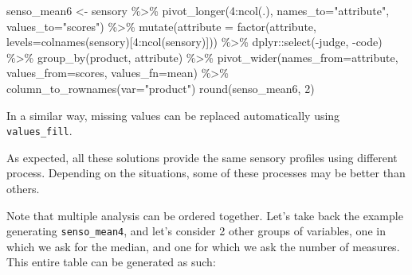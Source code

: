 \documentclass[
]{book}
\newenvironment{Shaded}{\begin{snugshade}}{\end{snugshade}}
\newcommand{\AttributeTok}[1]{\textcolor[rgb]{0.77,0.63,0.00}{#1}}
\newcommand{\DecValTok}[1]{\textcolor[rgb]{0.00,0.00,0.81}{#1}}
\newcommand{\FunctionTok}[1]{\textcolor[rgb]{0.00,0.00,0.00}{#1}}
\newcommand{\NormalTok}[1]{#1}
\newcommand{\OtherTok}[1]{\textcolor[rgb]{0.56,0.35,0.01}{#1}}
\newcommand{\SpecialCharTok}[1]{\textcolor[rgb]{0.00,0.00,0.00}{#1}}
\newcommand{\StringTok}[1]{\textcolor[rgb]{0.31,0.60,0.02}{#1}}
\begin{document}
\begin{Shaded}
\begin{Highlighting}[]
\NormalTok{senso\_mean6 }\OtherTok{\textless{}{-}}\NormalTok{ sensory }\SpecialCharTok{\%\textgreater{}\%} 
  \FunctionTok{pivot\_longer}\NormalTok{(}\DecValTok{4}\SpecialCharTok{:}\FunctionTok{ncol}\NormalTok{(.), }\AttributeTok{names\_to=}\StringTok{"attribute"}\NormalTok{, }\AttributeTok{values\_to=}\StringTok{"scores"}\NormalTok{) }\SpecialCharTok{\%\textgreater{}\%} 
  \FunctionTok{mutate}\NormalTok{(}\AttributeTok{attribute =} \FunctionTok{factor}\NormalTok{(attribute, }\AttributeTok{levels=}\FunctionTok{colnames}\NormalTok{(sensory)[}\DecValTok{4}\SpecialCharTok{:}\FunctionTok{ncol}\NormalTok{(sensory)])) }\SpecialCharTok{\%\textgreater{}\%} 
\NormalTok{  dplyr}\SpecialCharTok{::}\FunctionTok{select}\NormalTok{(}\SpecialCharTok{{-}}\NormalTok{judge, }\SpecialCharTok{{-}}\NormalTok{code) }\SpecialCharTok{\%\textgreater{}\%} 
  \FunctionTok{group\_by}\NormalTok{(product, attribute) }\SpecialCharTok{\%\textgreater{}\%} 
  \FunctionTok{pivot\_wider}\NormalTok{(}\AttributeTok{names\_from=}\NormalTok{attribute, }\AttributeTok{values\_from=}\NormalTok{scores, }\AttributeTok{values\_fn=}\NormalTok{mean) }\SpecialCharTok{\%\textgreater{}\%} 
  \FunctionTok{column\_to\_rownames}\NormalTok{(}\AttributeTok{var=}\StringTok{"product"}\NormalTok{)}
\FunctionTok{round}\NormalTok{(senso\_mean6, }\DecValTok{2}\NormalTok{)}
\end{Highlighting}
\end{Shaded}

In a similar way, missing values can be replaced automatically using \texttt{values\_fill}.

As expected, all these solutions provide the same sensory profiles using different process. Depending on the situations, some of these processes may be better than others.

Note that multiple analysis can be ordered together. Let's take back the example generating \texttt{senso\_mean4}, and let's consider 2 other groups of variables, one in which we ask for the median, and one for which we ask the number of measures. This entire table can be generated as such:
\end{document}
